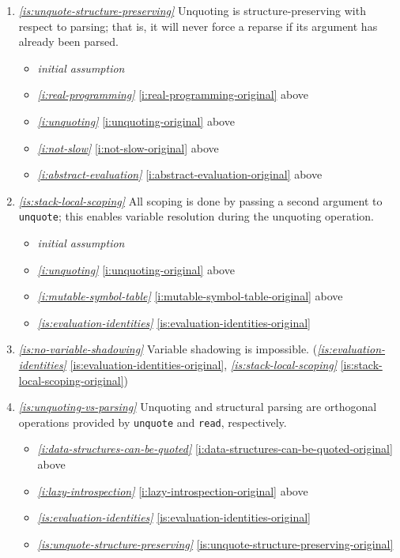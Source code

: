\documentclass{report}
\makeatletter
\newcommand*{\Label}[2]{%
  \@bsphack
  \begingroup
    \label{#1-original}%
    \def\@currentlabel{#2}%
    \label{#1}%
  \endgroup
  \@esphack
}
\newcommand{\initial}{{\em initial assumption}}
\newcommand{\refboth}[1]{{\em \ref{#1}} \ref{#1-original}}
\makeatother
\begin{document}
\begin{enumerate}
\item{}\Label{is:unquote-structure-preserving}{xhs.unquote-structure}{\em\ref{is:unquote-structure-preserving}}
  Unquoting is structure-preserving with respect to parsing; that is, it
  will never force a reparse if its argument has already been parsed.
\begin{itemize}
\item \initial
\item \refboth{i:real-programming} above
\item \refboth{i:unquoting} above
\item \refboth{i:not-slow} above
\item \refboth{i:abstract-evaluation} above
\end{itemize}
\item{}\Label{is:stack-local-scoping}{xhs.stackscope}{\em\ref{is:stack-local-scoping}}
  All scoping is done by passing a second argument to {\tt unquote}; this
  enables variable resolution during the unquoting operation.
\begin{itemize}
\item \initial
\item \refboth{i:unquoting} above
\item \refboth{i:mutable-symbol-table} above
\item \refboth{is:evaluation-identities}
\end{itemize}
\item{}\Label{is:no-variable-shadowing}{xhs.noshadow}{\em\ref{is:no-variable-shadowing}}
  Variable shadowing is impossible.
(\refboth{is:evaluation-identities}, \refboth{is:stack-local-scoping})
\item{}\Label{is:unquoting-vs-parsing}{xhs.unquote-parse}{\em\ref{is:unquoting-vs-parsing}}
  Unquoting and structural parsing are orthogonal operations provided by
  {\tt unquote} and {\tt read}, respectively.
\begin{itemize}
\item \refboth{i:data-structures-can-be-quoted} above
\item \refboth{i:lazy-introspection} above
\item \refboth{is:evaluation-identities}
\item \refboth{is:unquote-structure-preserving}
\end{itemize}


\end{enumerate}
\end{document}
